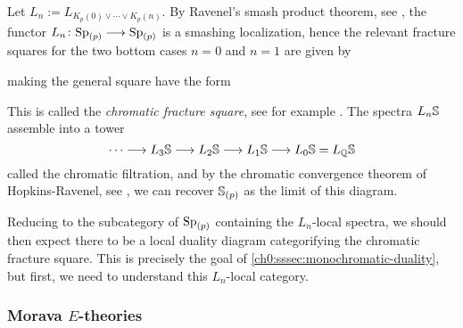 Let $L_n := L_{K_p(0)\vee \cdots \vee K_p(n)}$. By Ravenel's smash product theorem, see \cite[7.5.6]{ravenel_92}, the functor $L_n\colon \sp_{(p)}\longrightarrow \sp_{(p)}$ is a smashing localization, hence the relevant fracture squares for the two bottom cases $n=0$ and $n=1$ are given by
\begin{center}
\end{center}
making the general square have the form
\begin{center}
\end{center}
This is called the \emph{chromatic fracture square}, see for example \cite[4.3]{hovey_95}. The spectra $L_n\S$ assemble into a tower 
$$\cdots \longrightarrow L_3\S \longrightarrow L_2\S \longrightarrow L_1\S \longrightarrow L_0 \S = L_\Q\S$$
called the chromatic filtration, and by the chromatic convergence theorem of Hopkins-Ravenel, see \cite[7.5.7]{ravenel_92}, we can recover $\S_{(p)}$ as the limit of this diagram. 


\begin{remark}
    \label{ch0:rm:chromatic-square-from-duality}
    Reducing to the subcategory of $\sp_{(p)}$ containing the $L_n$-local spectra, we should then expect there to be a local duality diagram categorifying the chromatic fracture square. This is precisely the goal of \cref{ch0:sssec:monochromatic-duality}, but first, we need to understand this $L_n$-local category. 
\end{remark}







\subsubsection{Morava \texorpdfstring{$E$}{E}-theories}
\label{ch0:sssec:morava-E-theories}

